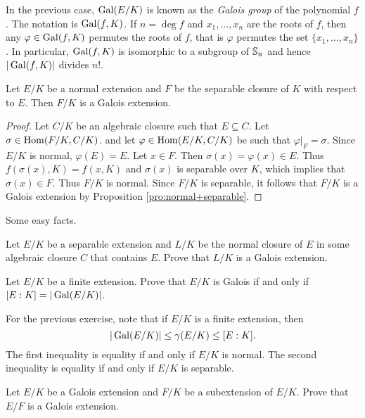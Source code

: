 In the previous case, $\operatorname{Gal}(E/K)$ is known as the \emph{Galois group}
of the polynomial $f$. The notation is $\operatorname{Gal}(f,K)$. If $n=\deg f$ and
$x_1,\dots,x_n$ are the roots of $f$, then any 
$\varphi\in\operatorname{Gal}(f,K)$ permutes the roots of $f$, that is
$\varphi$ permutes the 
set $\{x_1,\dots,x_n\}$. In particular, $\operatorname{Gal}(f,K)$ is isomorphic to a subgroup of
$\mathbb{S}_n$ and hence $|\operatorname{Gal}(f,K)|$ divides $n!$. 

\begin{proposition}
    Let $E/K$ be a normal extension and $F$ be the separable
    closure of $K$ with respect to $E$. 
    Then $F/K$ is a Galois extension.
\end{proposition}

\begin{proof} 
    Let $C/K$ be an algebraic closure such that $E\subseteq C$. Let $\sigma\in\operatorname{Hom}(F/K,C/K)$. 
    and let $\varphi\in\operatorname{Hom}(E/K,C/K)$ be such that $\varphi|_F=\sigma$. Since $E/K$ is normal, 
    $\varphi(E)=E$. Let $x\in F$. Then $\sigma(x)=\varphi(x)\in E$. Thus
    $f(\sigma(x),K)=f(x,K)$ and $\sigma(x)$ is separable over $K$, which 
    implies that $\sigma(x)\in F$. Thus $F/K$ is normal. Since $F/K$ is separable, it follows
    that $F/K$ is a Galois extension by Proposition \ref{pro:normal+separable}.
\end{proof}

Some easy facts.

\begin{exercise}
    Let $E/K$ be a separable extension and $L/K$ be the normal 
    closure of $E$ in some algebraic closure $C$
    that contains $E$. Prove that $L/K$ is a Galois extension.
\end{exercise}

\begin{exercise}
    Let $E/K$ be a finite extension. Prove that $E/K$ is Galois
    if and only if $[E:K]=|\operatorname{Gal}(E/K)|$.
\end{exercise}

For the previous exercise, 
note that if $E/K$ is a finite extension, then  
\[
|\operatorname{Gal}(E/K)|\leq\gamma(E/K)\leq [E:K].
\]
The first inequality
is equality if and only if $E/K$ is normal. The second
inequality is equality if and only if $E/K$ is separable.

\begin{exercise}
    Let $E/K$ be a Galois extension and $F/K$ be a subextension of $E/K$. 
    Prove that $E/F$ is a Galois extension. 
\end{exercise}


